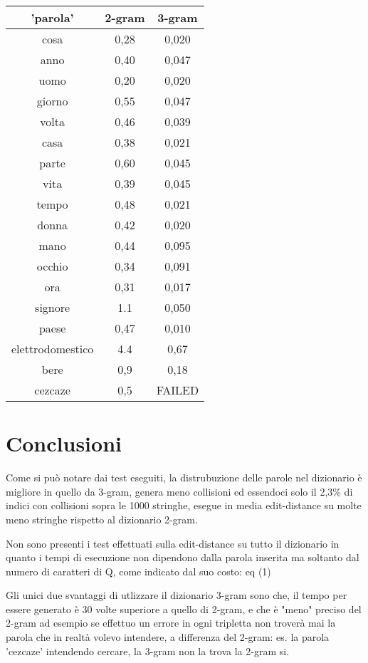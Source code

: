 \documentclass{article}
\begin{document}
\begin{center}
 \begin{tabular}{||c c c||} 
 \hline
 'parola' & 2-gram & 3-gram\\ [0.5ex] 
 \hline\hline
 cosa & 0,28 & 0,020\\ 
 \hline
 anno & 0,40 & 0,047\\
 \hline
 uomo & 0,20 & 0,020\\ 
 \hline
 giorno & 0,55 & 0,047\\
 \hline
 volta & 0,46 & 0,039\\ 
 \hline
 casa & 0,38 & 0,021\\
 \hline
 parte & 0,60 & 0,045\\ 
 \hline
 vita & 0,39 & 0,045\\
 \hline
 tempo & 0,48 & 0,021\\ 
 \hline
 donna & 0,42 & 0,020\\
 \hline
 mano & 0,44 & 0,095\\ 
 \hline
 occhio & 0,34 & 0,091\\
 \hline
 ora & 0,31 & 0,017\\ 
 \hline
 signore & 1.1 & 0,050\\
 \hline
 paese & 0,47 & 0,010\\
 \hline
 elettrodomestico & 4.4 & 0,67\\
 \hline
 bere & 0,9 & 0,18\\
 \hline
 cezcaze & 0,5 & FAILED\\[1ex]
 \hline
\end{tabular}
\end{center}

\section{Conclusioni}
Come si può notare dai test eseguiti, la distrubuzione delle parole nel dizionario è migliore in quello da 3-gram, genera meno collisioni ed essendoci solo il 2,3\% di indici con collisioni sopra le 1000 stringhe, esegue in media edit-distance su molte meno stringhe rispetto al dizionario 2-gram.\\
\smallskip

Non sono presenti i test effettuati sulla edit-distance su tutto il dizionario in quanto i tempi di esecuzione non dipendono dalla parola inserita ma soltanto dal numero di caratteri di Q, come indicato dal suo costo: eq (1)\\
\smallskip

Gli unici due svantaggi di utlizzare il dizionario 3-gram sono che, il tempo per essere generato è 30 volte superiore a quello di 2-gram, e che è "meno" preciso del 2-gram ad esempio se effettuo un errore in ogni tripletta non troverà mai la parola che in realtà volevo intendere, a differenza del 2-gram: es. la parola 'cezcaze' intendendo cercare, la 3-gram non la trova la 2-gram si.
\end{document}
